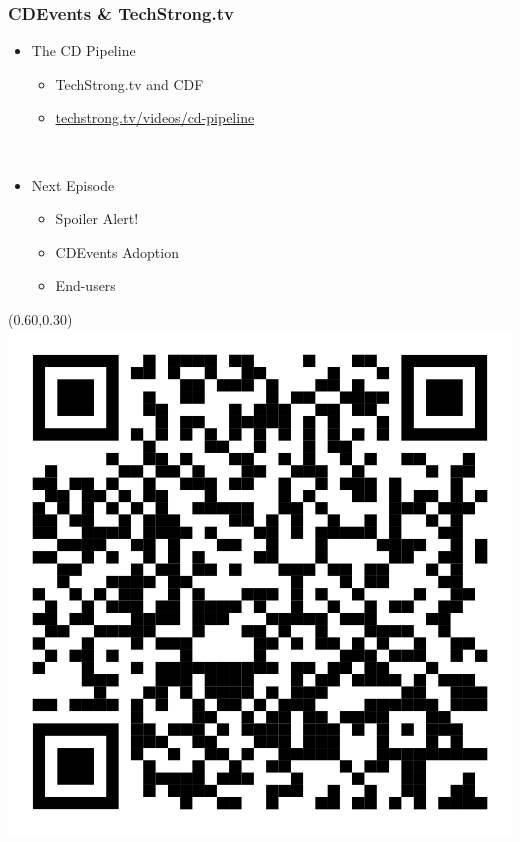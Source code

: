 \documentclass[aspectratio=169,11pt,hyperref={colorlinks=true}]{beamer}
\begin{document}
\begin{blackframe}
  \frametitle{CDEvents \& TechStrong.tv}
  \begin{itemize}
    \item The CD Pipeline
    \begin{itemize}
      \item TechStrong.tv and CDF
      \item \href{https://techstrong.tv/videos/cd-pipeline}{techstrong.tv/videos/cd-pipeline}
    \end{itemize}
  \end{itemize}
  ~
  ~
  \begin{itemize}
    \item Next Episode
    \begin{itemize}
      \item Spoiler Alert!
      \item CDEvents Adoption
      \item End-users
    \end{itemize}
  \end{itemize}
  \begin{textblock*}{0.20\paperwidth}(0.60\paperwidth,0.30\paperheight)
    \includegraphics[width=0.20\paperwidth]{img/techstrong-tv-the-cd-pipeline.png}
  \end{textblock*}
\end{blackframe}
\end{document}
